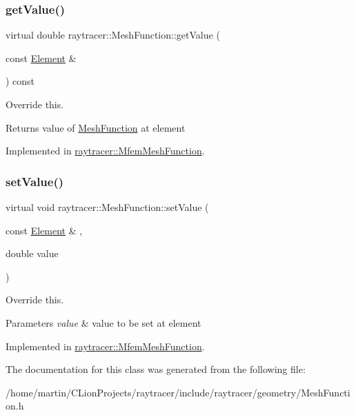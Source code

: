 \subsubsection{\texorpdfstring{get\+Value()}{getValue()}}
{\footnotesize\ttfamily virtual double raytracer\+::\+Mesh\+Function\+::get\+Value (\begin{DoxyParamCaption}\item[{const \hyperlink{classraytracer_1_1Element}{Element} \&}]{ }\end{DoxyParamCaption}) const\hspace{0.3cm}{\ttfamily [pure virtual]}}



Override this. 

\begin{DoxyReturn}{Returns}
value of \hyperlink{classraytracer_1_1MeshFunction}{Mesh\+Function} at element 
\end{DoxyReturn}


Implemented in \hyperlink{classraytracer_1_1MfemMeshFunction_a3e7183c2cca55df6115176d1d9030846}{raytracer\+::\+Mfem\+Mesh\+Function}.

\mbox{\label{classraytracer_1_1MeshFunction_a0d71fc5b456edd7a89267a071ae6dd81}} 
\subsubsection{\texorpdfstring{set\+Value()}{setValue()}}
{\footnotesize\ttfamily virtual void raytracer\+::\+Mesh\+Function\+::set\+Value (\begin{DoxyParamCaption}\item[{const \hyperlink{classraytracer_1_1Element}{Element} \&}]{,  }\item[{double}]{value }\end{DoxyParamCaption})\hspace{0.3cm}{\ttfamily [pure virtual]}}



Override this. 


\begin{DoxyParams}{Parameters}
{\em value} & value to be set at element \\
\hline
\end{DoxyParams}


Implemented in \hyperlink{classraytracer_1_1MfemMeshFunction_aa7c06ea3f585a45573174b073da58ee1}{raytracer\+::\+Mfem\+Mesh\+Function}.



The documentation for this class was generated from the following file\+:\begin{DoxyCompactItemize}
\item 
/home/martin/\+C\+Lion\+Projects/raytracer/include/raytracer/geometry/Mesh\+Function.\+h\end{DoxyCompactItemize}
